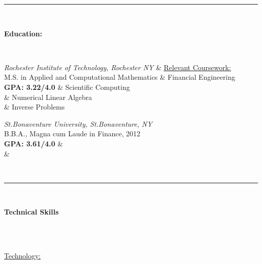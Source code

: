 \documentclass{res}
\begin{document}
 
\begin{resume}
	
\newcommand{\LINE}{\rule{.88\linewidth}{.75 pt}\\}
\newcommand{\Line}{\rule{.87\linewidth}{.5 pt}\\}
\newcommand{\secspace}{\vspace {.15 in}}
\newcommand{\subsecspace}{\vspace{.05 in}}


\newcommand{\relcourse}[4]{\begin{ncolumn}{2}   \vspace{-.1 pt} \textit{Rochester Institute of Technology, Rochester NY} & \vspace{-.1 pt} \underline{Relevant Coursework:}  \\
M.S. in Applied and Computational Mathematics &  #1  	\\
 \textbf{GPA: \hspace{3 pt}  3.22/4.0} & #2\\
  & #3   \\
  & #4   \\      \end{ncolumn}\vspace{-25 pt} }


\newcommand{\resheading}[1]{{\LINE \large \colorbox{mygrey}{\begin{minipage}{.87\linewidth}{\textbf{#1 \vphantom{p\^{E}}}}\end{minipage}}}}

\vspace{15 pt}

\vspace{- 18 pt}

\resheading{Education:}\\
\relcourse{Financial Engineering}{Scientific Computing}{Numerical Linear Algebra}{Inverse Problems}

\begin{ncolumn}{2}
 \textit{St.Bonaventure University, St.Bonaventure, NY} \\
  B.B.A., Magna cum Laude in Finance, 2012  \\
   \textbf{GPA:\hspace{3 pt} 3.61/4.0} &   \\
   &     \\ 
  \end{ncolumn} \\ 
\resheading{Technical Skills}\\
\vspace{-5 pt}\\
\begin{minipage}{.5\textwidth} \normalsize{ \underline{ Technology:}    }
		

\end{minipage}
\end{resume}
\end{document}
